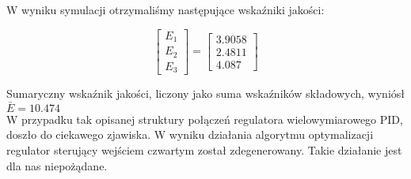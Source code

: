 W wyniku symulacji otrzymaliśmy następujące wskaźniki jakości:

\[
\begin{bmatrix}
    E_{\mathrm{1}} \\
    E_{\mathrm{2}} \\
    E_{\mathrm{3}} 
\end{bmatrix}
= 
\begin{bmatrix}
    \num{3.9058} \\
    \num{2.4811} \\
    \num{4.087}
\end{bmatrix}
\]

Sumaryczny wskaźnik jakości, liczony jako suma wskaźników składowych, 
wyniósł $\bar{E} = \num{10.474}$\\

W przypadku tak opisanej struktury połączeń regulatora wielowymiarowego PID, doszło do ciekawego
zjawiska. W wyniku działania algorytmu optymalizacji regulator sterujący wejściem czwartym 
został zdegenerowany. Takie działanie jest dla nas niepożądane.

